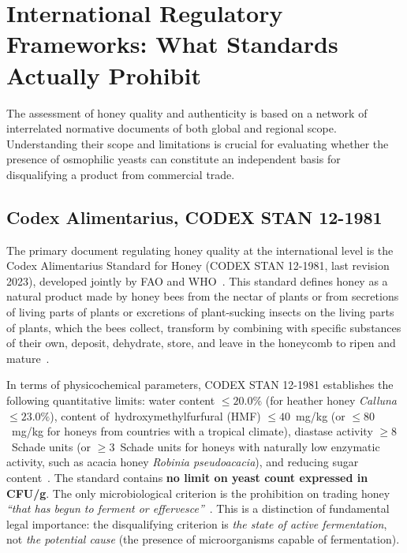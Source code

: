 
\section{International Regulatory Frameworks: What Standards Actually Prohibit}

The assessment of honey quality and authenticity is based on a network
of interrelated normative documents of both global and regional scope.
Understanding their scope and limitations is crucial for evaluating
whether the presence of osmophilic yeasts can constitute an independent
basis for disqualifying a product from commercial trade.

\subsection{Codex Alimentarius, CODEX STAN 12-1981}

The primary document regulating honey quality at the international
level is the Codex Alimentarius Standard for Honey
(CODEX STAN 12-1981, last revision 2023), developed jointly
by FAO and WHO~\cite{codex_stan12}. This standard defines honey
as a natural product made by honey bees from the nectar of plants
or from secretions of living parts of plants or excretions of
plant-sucking insects on the living parts of plants, which the bees
collect, transform by combining with specific substances of their own,
deposit, dehydrate, store, and leave in the honeycomb to ripen and
mature~\cite{codex_stan12}.

In terms of physicochemical parameters, CODEX STAN 12-1981 establishes
the following quantitative limits: water content $\leq 20.0\%$
(for heather honey \textit{Calluna} $\leq 23.0\%$), content
of~hydroxymethylfurfural (HMF) $\leq 40$~mg/kg (or $\leq 80$~mg/kg
for honeys from countries with a tropical climate), diastase
activity $\geq 8$~Schade units (or $\geq 3$~Schade units for honeys
with naturally low enzymatic activity, such as acacia honey
\textit{Robinia pseudoacacia}), and reducing sugar
content~\cite{codex_stan12}. The standard contains \textbf{no limit
on yeast count expressed in CFU/g}. The only microbiological criterion
is the prohibition on trading honey \emph{``that has begun to ferment
or effervesce''}~\cite{codex_stan12}. This is a distinction of
fundamental legal importance: the disqualifying criterion is
\emph{the state of active fermentation}, not \emph{the potential
cause} (the presence of microorganisms capable of fermentation).

